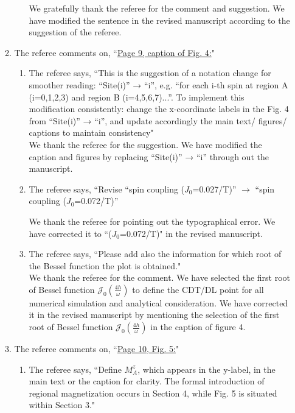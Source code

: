 \documentclass[aps,prb,reprint,showpacs,floatfix,superscriptaddress, onecolumn, nofootinbib, 10pt]{revtex4-2}
\newcommand{\response}[1]{{\color{black}#1}} %
\newcommand{\comment}[1]{{\color{blue}#1}} %
\begin{document}
\begin{enumerate}
\begin{enumerate}
\begin{enumerate}
			\response{We gratefully thank the referee for the comment and suggestion. We have modified the sentence in the revised manuscript according to the suggestion of the referee.}
		\end{enumerate}
		\item The referee comments on, \comment{``\underline{Page 9, caption of Fig. 4:}"}
		\begin{enumerate}
			\item The referee says, \comment{``This is the suggestion of a notation change for smoother reading: “Site(i)” → “i”, 
			e.g. “for each i-th spin at region A (i=0,1,2,3) and region B (i=4,5,6,7)...”. To implement this modification consistently: change the x-coordinate labels in the Fig. 4 from “Site(i)” → “i”, and update accordingly the main text/ figures/ captions to
			maintain consistency"}\\
		
			\response{We thank the referee for the suggestion. We have modified the caption and figures by replacing ``Site(i)” → ``i” through out the manuscript.}
			\item The referee says, \comment{``Revise “spin coupling ($J_0$=0.027/T)” $\rightarrow$ “spin coupling ($J_0$=0.072/T)”}
			
			\response{We thank the referee for pointing out the typographical error. We have corrected it to ``($J_0$=0.072/T)" in the revised manuscript.}\\
			\item The referee says, \comment{``Please add also the information for which root of the Bessel function the plot is obtained."}\\
			
			\response{We thank the referee for the comment. We have selected the first root of Bessel function $\mathcal{J}_0\left(\frac{4h}{\omega}\right)$ to define the CDT/DL point for all numerical simulation and analytical consideration. We have corrected it in the revised manuscript by mentioning the selection of the first root of Bessel function $\mathcal{J}_0\left(\frac{4h}{\omega}\right)$ in the caption of figure 4.}
		\end{enumerate}
		\item The referee comments on, \comment{``\underline{Page 10, Fig. 5:}"}
		\begin{enumerate}
			\item The referee says, \comment{``Define $M_A^z$, which appears in the y-label, in the main text or the caption for
			clarity. The formal introduction of regional magnetization occurs in Section 4, while Fig. 5 is situated within Section 3."}\\
		

\end{enumerate}
\end{enumerate}
\end{enumerate}
\end{document}
